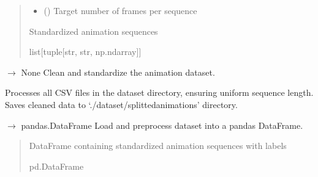 \documentclass[letterpaper,10pt,english]{sphinxmanual}
\begin{document}
\begin{fulllineitems}
\begin{quote}
\begin{description}
\begin{itemize}
\item {} 
\sphinxAtStartPar
{} () \textendash{} Target number of frames per sequence

\end{itemize}

\sphinxAtStartPar
Standardized animation sequences

\sphinxAtStartPar
list{[}tuple{[}str, str, np.ndarray{]}{]}

\end{description}\end{quote}

\end{fulllineitems}


\begin{fulllineitems}
\label{\detokenize{autoapi/src/DataLoader/index:src.DataLoader.dataset_cleaner}}
\pysigstartsignatures
\pysiglinewithargsret
{}
{}
{{ $\rightarrow$ None}}
\pysigstopsignatures
\sphinxAtStartPar
Clean and standardize the animation dataset.

\sphinxAtStartPar
Processes all CSV files in the dataset directory, ensuring uniform sequence length.
Saves cleaned data to ‘./dataset/splitted\sphinxhyphen{}animations’ directory.

\end{fulllineitems}


\begin{fulllineitems}
\label{\detokenize{autoapi/src/DataLoader/index:src.DataLoader.load_dataset_as_dataframe}}
\pysigstartsignatures
\pysiglinewithargsret
{}
{}
{{ $\rightarrow$ pandas.DataFrame}}
\pysigstopsignatures
\sphinxAtStartPar
Load and preprocess dataset into a pandas DataFrame.
\begin{quote}\begin{description}
\sphinxAtStartPar
DataFrame containing standardized animation sequences with labels

\sphinxAtStartPar
pd.DataFrame

\end{description}\end{quote}

\end{fulllineitems}
\end{document}
